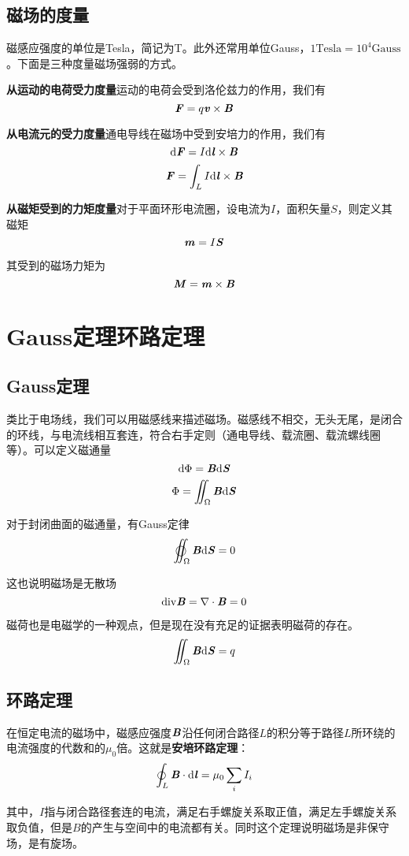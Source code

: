 \documentclass[UTF8,openany]{book}
\begin{document}
	\subsection{磁场的度量}
	\par 磁感应强度的单位是Tesla，简记为T。此外还常用单位Gauss，$1\mathrm{Tesla}=10^{4}\mathrm{Gauss}$。下面是三种度量磁场强弱的方式。
	\par \textbf{从运动的电荷受力度量}\quad 运动的电荷会受到洛伦兹力的作用，我们有
	$$\textbf{\textit{F}}=q\textbf{\textit{v}}\times\textbf{\textit{B}}$$
	\par \textbf{从电流元的受力度量}\quad 通电导线在磁场中受到安培力的作用，我们有
	$$\mathrm{d}\textbf{\textit{F}}=I\mathrm{d}\textbf{\textit{l}}\times\textbf{\textit{B}}$$
	$$\textbf{\textit{F}}=\int_{L}I\mathrm{d}\textbf{\textit{l}}\times\textbf{\textit{B}}$$
	\par \textbf{从磁矩受到的力矩度量}\quad 对于平面环形电流圈，设电流为$I$，面积矢量$S$，则定义其磁矩
	$$\textbf{\textit{m}}=I\textbf{\textit{S}}$$
	\par 其受到的磁场力矩为
	$$\textbf{\textit{M}}=\textbf{\textit{m}}\times\textbf{\textit{B}}$$
	\section{Gauss定理\quad 环路定理}
	\subsection{Gauss定理}
	\par 类比于电场线，我们可以用磁感线来描述磁场。磁感线不相交，无头无尾，是闭合的环线，与电流线相互套连，符合右手定则（通电导线、载流圈、载流螺线圈等）。可以定义磁通量
	$$\mathrm{d}\Phi=\textbf{\textit{B}}\mathrm{d}\textbf{\textit{S}}$$
	$$\Phi=\iint_{\Omega}\textbf{\textit{B}}\mathrm{d}\textbf{\textit{S}}$$
	\par 对于封闭曲面的磁通量，有Gauss定律
	$$\varoiint_{\Omega}\textbf{\textit{B}}\mathrm{d}\textbf{\textit{S}}=0$$
	\par 这也说明磁场是无散场
	$$\mathrm{div}\textbf{\textit{B}}=\nabla\cdot\textbf{\textit{B}}=0$$
	\par 磁荷也是电磁学的一种观点，但是现在没有充足的证据表明磁荷的存在。
	$$\iint_{\Omega}\textbf{\textit{B}}\mathrm{d}\textbf{\textit{S}}=q$$
	\subsection{环路定理}
	在恒定电流的磁场中，磁感应强度$\textbf{\textit{B}}$沿任何闭合路径$L$的积分等于路径$L$所环绕的电流强度的代数和的$\mu_0$倍。这就是\textbf{安培环路定理}：
	$$\oint_{L}\textbf{\textit{B}}\cdot\mathrm{d}\textbf{\textit{l}}=\mu_0\sum_{i}I_{i}$$
	\par 其中，$I$指与闭合路径套连的电流，满足右手螺旋关系取正值，满足左手螺旋关系取负值，但是$B$的产生与空间中的电流都有关。同时这个定理说明磁场是非保守场，是有旋场。
\end{document}
